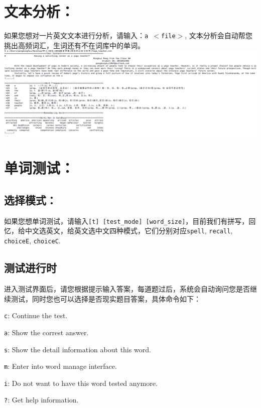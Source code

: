 \section{文本分析：}
\label{}

如果您想对一片英文文本进行分析，请输入：\texttt{a $<$file$>$}, 文本分析会自动帮您挑出高频词汇，生词还有不在词库中的单词。
\includegraphics[keepaspectratio,width=\textwidth,height=0.75\textheight]{picture4.png}

\section{单词测试：}
\label{}

\subsection{选择模式：}
\label{}

如果您想单词测试，请输入\texttt{[t] [test\_mode] [word\_size]}，目前我们有拼写，回忆，给中文选英文，给英文选中文四种模式，它们分别对应\texttt{spell}, \texttt{recall}, \texttt{choiceE}, \texttt{choiceC}.

\subsection{测试进行时}
\label{}

进入测试界面后，请您根据提示输入答案，每道题过后，系统会自动询问您是否继续测试，同时您也可以选择是否现实题目答案，具体命令如下：

\texttt{c}: Continue the test.

\texttt{a}: Show the correst answer.

\texttt{s}: Show the detail information about this word.

\texttt{m}: Enter into word manage interface.

\texttt{i}: Do not want to have this word tested anymore.

\texttt{?}: Get help information.

